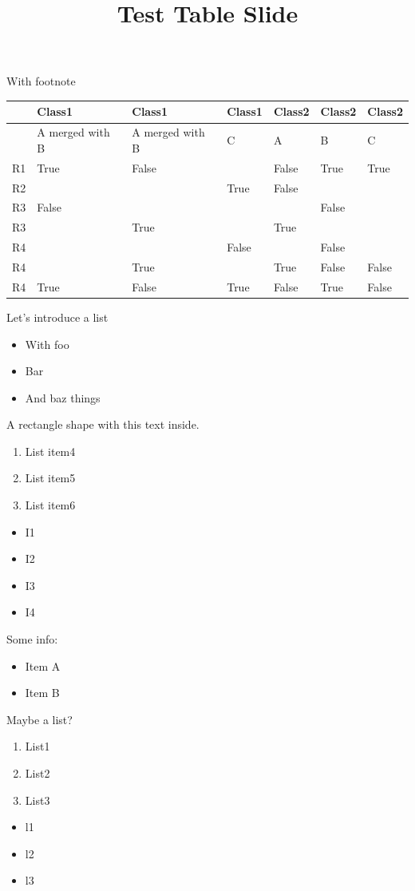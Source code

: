 \documentclass[11pt,a4paper]{article}
\title{Test Table Slide}
\begin{document}
\maketitle

With footnote

\begin{table}[h]
\begin{tabular}{|l|l|l|l|l|l|l|}
\hline
 & Class1 & Class1 & Class1 & Class2 & Class2 & Class2 \\ \hline
 & A merged with B & A merged with B & C & A & B & C \\ \hline
R1 & True & False &  & False & True & True \\ \hline
R2 &  &  & True & False &  &  \\ \hline
R3 & False &  &  &  & False &  \\ \hline
R3 &  & True &  & True &  &  \\ \hline
R4 &  &  & False &  & False &  \\ \hline
R4 &  & True &  & True & False & False \\ \hline
R4 & True & False & True & False & True & False \\ \hline
\end{tabular}
\end{table}

Let’s introduce a list

\begin{itemize}
\item With foo
\item Bar
\item And baz things
\end{itemize}

A rectangle shape with this text inside.

\begin{enumerate}
\item List item4
\item List item5
\item List item6
\end{enumerate}

\begin{itemize}
\item I1
\item I2
\item I3
\item I4
\end{itemize}

Some info:

\begin{itemize}
\item Item A
\item Item B
\end{itemize}

Maybe a list?

\begin{enumerate}
\item List1
\item List2
\item List3
\end{enumerate}

\begin{itemize}
\item l1
\item l2
\item l3
\end{itemize}
\end{document}
